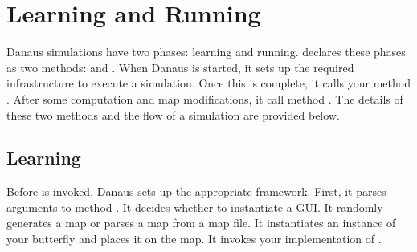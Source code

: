 \documentclass{pset}
\begin{document}
\section{Learning and Running}\label{sec:learnrun}
% 

Danaus simulations have two phases: learning and running.
 declares these phases as two methods:
 and  
. When Danaus is started, it sets up the required
infrastructure to execute a simulation. Once this is complete, it calls your
method . After some computation and map modifications, it call
method . The details of these two methods and the flow of a
simulation are provided below.

\ifx \LEARNING \undefined \else
\subsection{Learning}
Before  is invoked, Danaus sets up the appropriate framework.
First, it parses arguments to method . It decides whether to
instantiate a GUI\@. It randomly generates a map or parses a map from a map
file.  It instantiates an instance of your butterfly and places it on the map.
It invokes your implementation of . 
\end{document}
